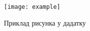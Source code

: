 
\begin{figure}[h]
  \centering
  \texttt{[image: example]}
  \caption{\label{img:layout}Приклад рисунка у дадатку}
\end{figure}

